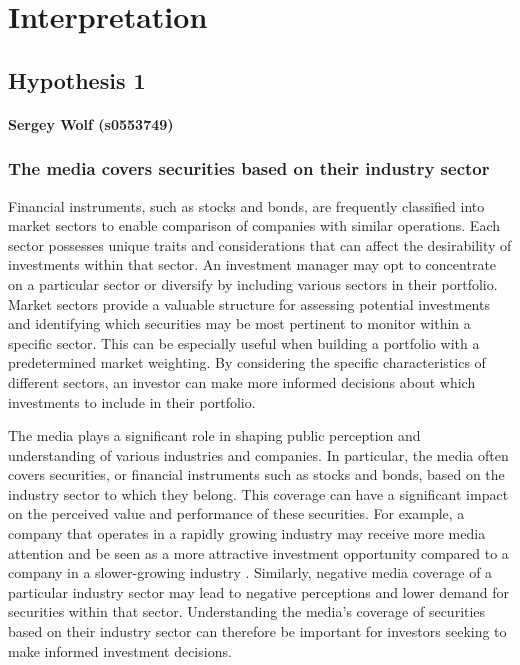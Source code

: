 \chapter{Interpretation}
\label{cha:interpretation}

\section{Hypothesis 1}
\subsubsection*{Sergey Wolf (s0553749)}
\label{cha:hypothesis-1}
\subsection{The media covers securities based on their industry sector}

Financial instruments, such as stocks and bonds, are frequently classified into market sectors to enable comparison of companies with similar operations. Each sector possesses unique traits and considerations that can affect the desirability of investments within that sector. An investment manager may opt to concentrate on a particular sector or diversify by including various sectors in their portfolio.
Market sectors provide a valuable structure for assessing potential investments and identifying which securities may be most pertinent to monitor within a specific sector. This can be especially useful when building a portfolio with a predetermined market weighting. By considering the specific characteristics of different sectors, an investor can make more informed decisions about which investments to include in their portfolio. \cite{kalyani2016stock}

The media plays a significant role in shaping public perception and understanding of various industries and companies. In particular, the media often covers securities, or financial instruments such as stocks and bonds, based on the industry sector to which they belong. This coverage can have a significant impact on the perceived value and performance of these securities. For example, a company that operates in a rapidly growing industry may receive more media attention and be seen as a more attractive investment opportunity compared to a company in a slower-growing industry \cite{MediaCov52:online}. Similarly, negative media coverage of a particular industry sector may lead to negative perceptions and lower demand for securities within that sector. Understanding the media's coverage of securities based on their industry sector can therefore be important for investors seeking to make informed investment decisions.

